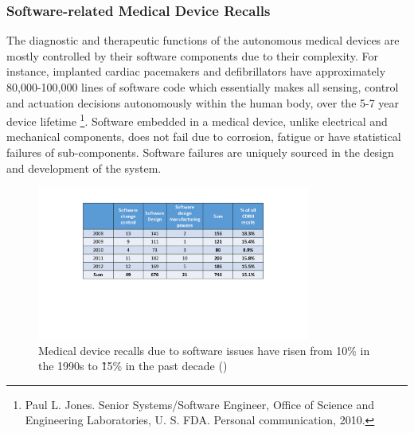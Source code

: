 \subsubsection{Software-related Medical Device Recalls}
The diagnostic and therapeutic functions of the autonomous medical devices are mostly controlled by their software components due to their complexity. 
For instance, implanted cardiac pacemakers and defibrillators have approximately 80,000-100,000 lines of software code which essentially makes all sensing, control and actuation decisions autonomously within the human body, over the 5-7 year device lifetime \footnote{Paul L. Jones. Senior Systems/Software Engineer, Office of Science and Engineering Laboratories, U. S. FDA. Personal communication, 2010.}. 
Software embedded in a medical device, unlike electrical and mechanical components, does not fail due to corrosion, fatigue or have statistical failures of sub-components. 
Software failures are uniquely sourced in the design and development of the system. %
\begin{figure}[t]
		\centering
		\includegraphics[width=0.8\textwidth]{figs/recalls.pdf}
		\caption{\small Medical device recalls due to software issues have risen from 10\% in the 1990s to \~15\% in the past decade (\cite{recall_rep})}
		\label{fig:soft_recalls}
\end{figure}

